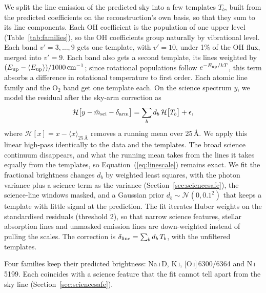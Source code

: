 We split the line emission of the predicted sky into a few templates $T_b$,
built from the predicted coefficients on the reconstruction's own basis, so
that they sum to its line components. Each OH coefficient is the population
of one upper level (Table~\ref{tab:families}), so the OH coefficients group
naturally by vibrational level. Each band $v'=3,\dots,9$ gets one template,
with $v'=10$, under 1\% of the OH flux, merged into $v'=9$. Each band also
gets a second template, its lines weighted by
$(E_{\rm up}-\langle E_{\rm up}\rangle)/1000\,{\rm cm}^{-1}$; since
rotational populations follow $e^{-E_{\rm up}/kT}$, this term absorbs a
difference in rotational temperature to first order. Each atomic line family
and the O$_2$ band get one template each. On the science spectrum $y$, we
model the residual after the sky-arm correction as
\begin{equation}
  \mathcal H\big[y - \hat m_{\rm sci} - \delta_{\rm arm}\big]
  = \sum_b d_b\,\mathcal H\big[T_b\big] + \epsilon ,
  \label{eq:linescale}
\end{equation}
where $\mathcal H[x] = x - \langle x\rangle_{25\,\text{\AA}}$ removes a
running mean over 25\,\AA. We apply this linear high-pass identically to the
data and the templates. The broad science continuum disappears, and what the
running mean takes from the lines it takes equally from the templates, so
Equation~(\ref{eq:linescale}) remains exact. We fit the fractional
brightness changes $d_b$ by weighted least squares, with the photon variance
plus a science term as the variance (Section~\ref{sec:sciencesafe}), the
science-line windows masked, and a Gaussian prior $d_b\sim\mathcal N(0,
0.1^2)$ that keeps a template with little signal at the prediction. The fit
iterates Huber weights on the standardised residuals (threshold 2), so that
narrow science features, stellar absorption lines and unmasked emission
lines are down-weighted instead of pulling the scales. The correction is
$\delta_{\rm line}=\sum_b d_b\,T_b$, with the unfiltered templates.

Four families keep their predicted brightness: Na\,\textsc{i}\,D,
K\,\textsc{i}, [O\,\textsc{i}]\,6300/6364 and N\,\textsc{i}\,5199. Each
coincides with a science feature that the fit cannot tell apart from the sky
line (Section~\ref{sec:sciencesafe}).

